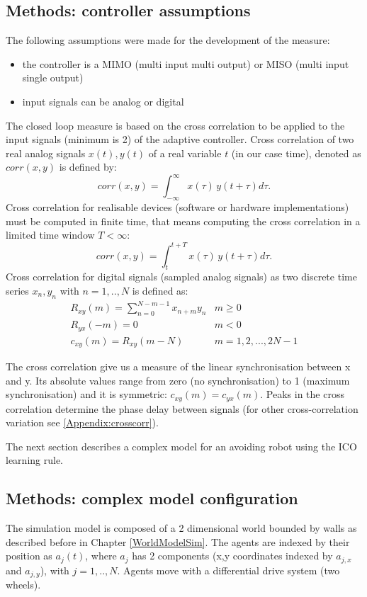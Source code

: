 \subsection{Methods: controller assumptions}
The following assumptions were made for the development of the measure:
\begin{itemize}
\item the controller is a MIMO (multi input multi output) or MISO (multi input single output)
\item input signals can be analog or digital
\end{itemize}

The closed loop measure is based on the cross correlation to be applied to the
input signals (minimum is 2) of the adaptive controller.
Cross correlation of two real analog signals $x(t),y(t)$ of a real variable $t$
(in our case time), denoted as $corr(x,y)$ is defined by:
\begin{equation}
corr(x,y)=\int_{-\infty}^\infty x(\tau)\,y(t+\tau)d\tau.
\end{equation}
Cross correlation for realisable devices (software or hardware implementations)
must be computed in finite time, that means computing the cross correlation
in a limited time window $T<\infty$:
\begin{equation}
corr(x,y)=\int_{t}^{t+T} x(\tau)\,y(t+\tau)d\tau.
\end{equation}
Cross correlation for digital signals (sampled analog signals) as two discrete
time series $x_{n},y_{n}$ with $n=1,..,N$ is defined as:
 \begin{eqnarray}
 R_{xy}(m)=\sum_{n=0}^{N-m-1}x_{n+m}y_{n} & m \geq 0 \\
 R_{yx}(-m)=0 & m <0\\
 c_{xy}(m)=R_{xy}(m-N) & m=1,2,...,2N-1\label{eq:xcorrdigital}
\end{eqnarray}

The cross correlation give us a measure of the linear synchronisation between x and y.
Its absolute values range from zero (no synchronisation) to 1 (maximum synchronisation)
and it is symmetric: $c_{xy}(m)=c_{yx}(m)$. Peaks in the cross correlation determine
the phase delay between signals (for other cross-correlation variation see \ref{Appendix:crosscorr}).

The next section describes a complex model for an avoiding robot using the ICO
learning rule.

\subsection{Methods: complex model configuration}
The simulation model is composed of a 2 dimensional world bounded by walls
as described before in Chapter \ref{WorldModelSim}.
The agents are indexed by their position as $a_{j}(t)$, where $a_{j}$
has 2 components (x,y coordinates indexed by $a_{j,x}$ and $a_{j,y}$),
with $j=1,..,N$. Agents move with a differential drive system (two wheels).


